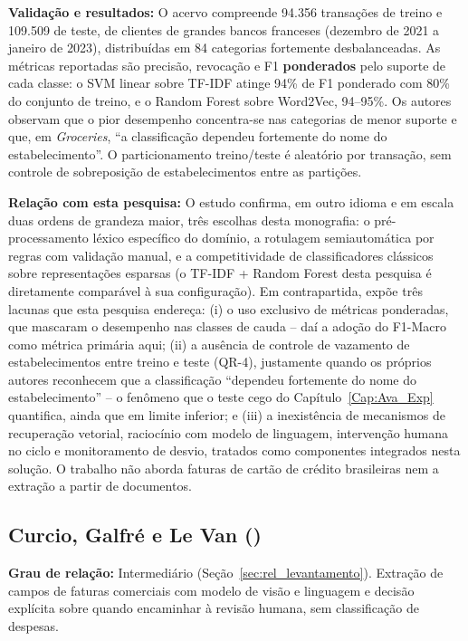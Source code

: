 \textbf{Validação e resultados:} O acervo compreende 94.356 transações de treino e 109.509 de teste, de clientes de grandes bancos franceses (dezembro de 2021 a janeiro de 2023), distribuídas em 84 categorias fortemente desbalanceadas. As métricas reportadas são precisão, revocação e F1 \textbf{ponderados} pelo suporte de cada classe: o SVM linear sobre TF-IDF atinge 94\% de F1 ponderado com 80\% do conjunto de treino, e o Random Forest sobre Word2Vec, 94--95\%. Os autores observam que o pior desempenho concentra-se nas categorias de menor suporte e que, em \textit{Groceries}, ``a classificação dependeu fortemente do nome do estabelecimento''. O particionamento treino/teste é aleatório por transação, sem controle de sobreposição de estabelecimentos entre as partições.

\textbf{Relação com esta pesquisa:} O estudo confirma, em outro idioma e em escala duas ordens de grandeza maior, três escolhas desta monografia: o pré-processamento léxico específico do domínio, a rotulagem semiautomática por regras com validação manual, e a competitividade de classificadores clássicos sobre representações esparsas (o TF-IDF + Random Forest desta pesquisa é diretamente comparável à sua configuração). Em contrapartida, expõe três lacunas que esta pesquisa endereça: (i) o uso exclusivo de métricas ponderadas, que mascaram o desempenho nas classes de cauda -- daí a adoção do F1-Macro como métrica primária aqui; (ii) a ausência de controle de vazamento de estabelecimentos entre treino e teste (QR-4), justamente quando os próprios autores reconhecem que a classificação ``dependeu fortemente do nome do estabelecimento'' -- o fenômeno que o teste cego do Capítulo~\ref{Cap:Ava_Exp} quantifica, ainda que em limite inferior; e (iii) a inexistência de mecanismos de recuperação vetorial, raciocínio com modelo de linguagem, intervenção humana no ciclo e monitoramento de desvio, tratados como componentes integrados nesta solução. O trabalho não aborda faturas de cartão de crédito brasileiras nem a extração a partir de documentos.

\subsection{Curcio, Galfré e Le Van (\citeyear{curcio2026safe})}
\textbf{Grau de relação:} Intermediário (Seção~\ref{sec:rel_levantamento}). Extração de campos de faturas comerciais com modelo de visão e linguagem e decisão explícita sobre quando encaminhar à revisão humana, sem classificação de despesas.

